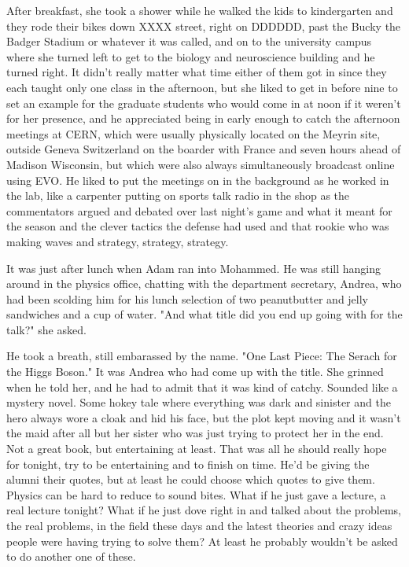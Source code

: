 \mymark

After breakfast, she took a shower while he walked the kids to kindergarten and they rode their bikes down XXXX street, right on DDDDDD, past the Bucky the Badger Stadium or whatever it was called, and on to the university campus where she turned left to get to the biology and neuroscience building and he turned right. It didn't really matter what time either of them got in since they each taught only one class in the afternoon, but she liked to get in before nine to set an example for the graduate students who would come in at noon if it weren't for her presence, and he appreciated being in early enough to catch the afternoon meetings at CERN, which were usually physically located on the Meyrin site, outside Geneva Switzerland on the boarder with France and seven hours ahead of Madison Wisconsin, but which were also always simultaneously broadcast online using EVO. He liked to put the meetings on in the background as he worked in the lab, like a carpenter putting on sports talk radio in the shop as the commentators argued and debated over last night's game and what it meant for the season and the clever tactics the defense had used and that rookie who was making waves and strategy, strategy, strategy.


\mymark

It was just after lunch when Adam ran into Mohammed. He was still hanging around in the physics office, chatting with the department secretary, Andrea, who had been scolding him for his lunch selection of two peanutbutter and jelly sandwiches and a cup of water. "And what title did you end up going with for the talk?" she asked.

He took a breath, still embarassed by the name. "One Last Piece: The Serach for the Higgs Boson." It was Andrea who had come up with the title. She grinned when he told her, and he had to admit that it was kind of catchy. Sounded like a mystery novel. Some hokey tale where everything was dark and sinister and the hero always wore a cloak and hid his face, but the plot kept moving and it wasn't the maid after all but her sister who was just trying to protect her in the end. Not a great book, but entertaining at least. That was all he should really hope for tonight, try to be entertaining and to finish on time. He'd be giving the alumni their quotes, but at least he could choose which quotes to give them. Physics can be hard to reduce to sound bites. What if he just gave a lecture, a real lecture tonight? What if he just dove right in and talked about the problems, the real problems, in the field these days and the latest theories and crazy ideas people were having trying to solve them? At least he probably wouldn't be asked to do another one of these. 

